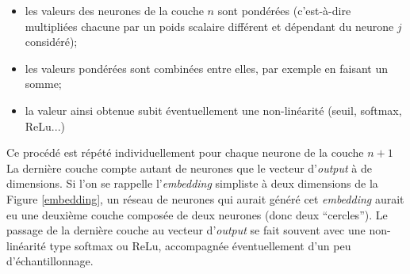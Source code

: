 \documentclass{article}
\begin{document}
					\vspace{2mm}
					\begin{itemize}
						\item les valeurs des neurones de la couche $n$ sont pondérées (c'est-à-dire multipliées chacune par un poids scalaire différent et dépendant du neurone $j$ considéré);
						\item les valeurs pondérées sont combinées entre elles, par exemple en faisant un somme;
						\item la valeur ainsi obtenue subit éventuellement une non-linéarité (seuil, softmax, ReLu...)
					\end{itemize}
					\vspace{2mm}
					Ce procédé est répété individuellement pour chaque neurone de la couche $n+1$\\
					La dernière couche compte autant de neurones que le vecteur d'\textit{output} à de dimensions. Si l'on se rappelle l'\textit{embedding} simpliste à deux dimensions de la Figure \ref{embedding}, un réseau de neurones qui aurait généré cet \textit{embedding} aurait eu une deuxième couche composée de deux neurones (donc deux ``cercles''). Le passage de la dernière couche au vecteur d'\textit{output} se fait souvent avec une non-linéarité type softmax ou ReLu, accompagnée éventuellement d'un peu d'échantillonnage.\\
					
\end{document}
